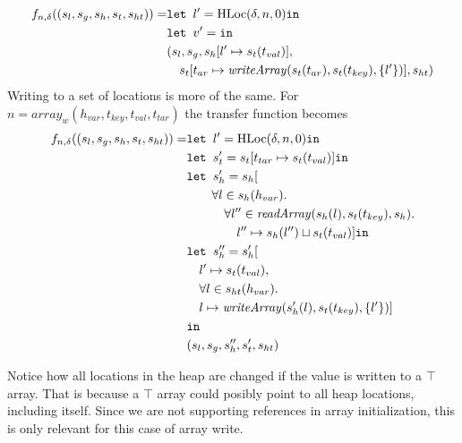 \begin{align}
f_{n,\delta}((s_l, s_g, s_h, s_t, s_{ht})) = & \texttt{let } l' = \text{HLoc}(\delta, n, 0) \texttt{in }\notag\\
                            & \texttt{let } v' =  \texttt{in }\notag\\
                            &(s_l, s_g, s_h[l'\mapsto s_t(t_{val})], \notag\\
                            &\quad s_t[t_{ar} \mapsto \mathit{writeArray}(s_t(t_{ar}), s_t(t_{key}), \{l'\})], s_{ht})
\end{align}
Writing to a set of locations is more of the same. For $n = \mathit{array}_w(h_{var}, t_{key},t_{val},t_{tar})$ the transfer function becomes
\begin{align}
f_{n,\delta}((s_l, s_g, s_h, s_t, s_{ht})) = &\texttt{let } l' = \text{HLoc}(\delta, n, 0) \texttt{in } \notag\\
                            &\texttt{let } s_t' = s_t[t_{tar}\mapsto s_t(t_{val})] \texttt{in }\notag\\
                            &\texttt{let } s_h' =  s_h[\notag\\
                            &\quad\quad\forall l \in s_h(h_{var}).\notag\\
                            &\quad\quad\quad\forall l'' \in \mathit{readArray}(s_h(l), s_t(t_{key}), s_h).\notag\\
                            &\quad\quad\quad\quad l''\mapsto s_h(l'') \sqcup s_t(t_{val})] \texttt{in }\notag\\
                            &\texttt{let } s_h'' = s_h'[\notag\\
                            &\quad l' \mapsto s_t(t_{val}), \notag\\
                            &\quad \forall l \in s_{ht}(h_{var}).\notag\\
                            &\quad l\mapsto \mathit{writeArray}(s_h'(l), s_t(t_{key}), \{l'\})]\notag\\
                            & \texttt{in }\notag\\
                            &(s_l, s_g, s_h'', s_t', s_{ht})
\end{align}


Notice how all locations in the heap are changed if the value is written to a $\top$ array. That is because a $\top$ array could posibly point to all heap locations, including itself. Since we are not supporting references in array initialization, this is only relevant for this case of array write. 

